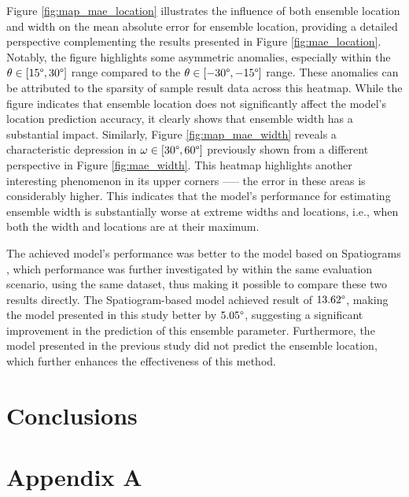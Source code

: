 \documentclass{article}
\begin{document}
Figure \ref{fig:map_mae_location} illustrates the influence of both ensemble location and width on the mean absolute error for ensemble location, providing a detailed perspective complementing the results presented in Figure \ref{fig:mae_location}. Notably, the figure highlights some asymmetric anomalies, especially within the $\theta \in [15\degree, 30\degree]$ range compared to the $\theta \in [-30\degree, -15\degree]$ range. These anomalies can be attributed to the sparsity of sample result data across this heatmap. While the figure indicates that ensemble location does not significantly affect the model's location prediction accuracy, it clearly shows that ensemble width has a substantial impact. Similarly, Figure \ref{fig:map_mae_width} reveals a characteristic depression in $\omega \in [30\degree, 60\degree]$ previously shown from a different perspective in Figure \ref{fig:mae_width}. This heatmap highlights another interesting phenomenon in its upper corners --— the error in these areas is considerably higher. This indicates that the model's performance for estimating ensemble width is substantially worse at extreme widths and locations, i.e., when both the width and locations are at their maximum.

The achieved model's performance was better to the model based on Spatiograms \parencite{arthi_spatiogram_2021}, which performance was further investigated by \cite{antoniuk_blind_2023} within the same evaluation scenario, using the same dataset, thus making it possible to compare these two results directly. The Spatiogram-based model achieved result of $13.62\degree$, making the model presented in this study better by $5.05\degree$, suggesting a significant improvement in the prediction of this ensemble parameter. Furthermore, the model presented in the previous study did not predict the ensemble location, which further enhances the effectiveness of this method.

\section{Conclusions}
\label{sec:conclusions}


\clearpage
\section*{Appendix A}
\label{appendix:a_hrtf}
\end{document}

